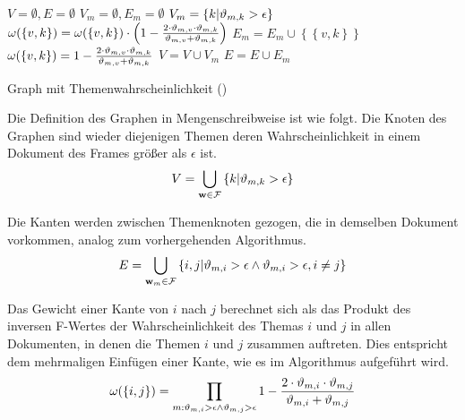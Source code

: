\begin{algorithm}[ht]
\begin{algorithmic}[1]
\STATE $V = \emptyset, E = \emptyset$
  \STATE $V_m = \emptyset, E_m = \emptyset$
  \STATE $V_m = \left\lbrace k | \vartheta_{m,k} > \epsilon \right\rbrace$
        \STATE $\omega(\left\lbrace v,k \right\rbrace) = \omega(\left\lbrace v,k \right\rbrace) \cdot \left( 1 - \frac{2 \cdot \vartheta_{m,v} \cdot \vartheta_{m,k}}{\vartheta_{m,v} + \vartheta_{m,k}}\right)$
      \ELSE
        \STATE $E_m = E_m \cup \left\lbrace \left\lbrace v,k \right\rbrace \right\rbrace$
        \STATE $\omega(\left\lbrace v,k \right\rbrace) = 1 - \frac{2 \cdot \vartheta_{m,v} \cdot \vartheta_{m,k}}{\vartheta_{m,v} + \vartheta_{m,k}}$
      \ENDIF
    \ENDFOR
  \ENDFOR
  \STATE $V = V \cup V_m$
  \STATE $E = E \cup E_m$
\ENDFOR 
\end{algorithmic}
\label{lst:topicProbFrameGraph}
\caption{Graph mit Themenwahrscheinlichkeit (\TPR)}
\end{algorithm}

Die Definition des Graphen in Mengenschreibweise ist wie folgt. Die Knoten des Graphen sind wieder diejenigen Themen deren Wahrscheinlichkeit in einem Dokument des Frames größer als $\epsilon$ ist.
\[
V = \bigcup_{\mathbf{w} \in \mathcal{F}} \left\{ k | \vartheta_{m,k} > \epsilon\right\}
\]

Die Kanten werden zwischen Themenknoten gezogen, die in demselben Dokument vorkommen, analog zum vorhergehenden Algorithmus.
\[
E = \bigcup_{\mathbf{w}_m \in \mathcal{F}} \left\{ {i,j} | \vartheta_{m,i} > \epsilon \wedge \vartheta_{m,i} > \epsilon, i \neq j \right\}
\]

Das Gewicht einer Kante von $i$ nach $j$ berechnet sich als das Produkt des inversen F-Wertes der Wahrscheinlichkeit des Themas $i$ und $j$ in allen Dokumenten, in denen die Themen $i$ und $j$ zusammen auftreten. Dies entspricht dem mehrmaligen Einfügen einer Kante, wie es im Algorithmus aufgeführt wird.
\[
\omega(\{i,j\}) = \prod_{m : \vartheta_{m,i} > \epsilon \wedge \vartheta_{m,j} > \epsilon} 1 -
\frac{2 \cdot \vartheta_{m,i} \cdot \vartheta_{m,j}}{\vartheta_{m,i} + \vartheta_{m,j}}
\]

